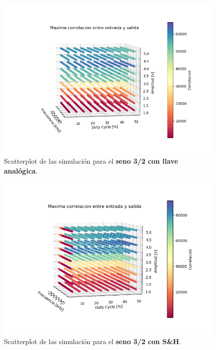 \begin{figure}[H]
\centering
	\includegraphics[width=0.8\linewidth]{ImagenesEjercicio6/scatter_llave_sen32.png}
	\caption{Scatterplot de las simulación para el \textbf{seno 3/2 con llave analógica}.}
	\label{sen32_llave}
\end{figure}

\begin{figure}[H]
\centering
	\includegraphics[width=0.8\linewidth]{ImagenesEjercicio6/scatter_sh_sen32.png}
	\caption{Scatterplot de las simulación para el \textbf{seno 3/2 con S\&H}.}
	\label{sen32_sh}
\end{figure}

